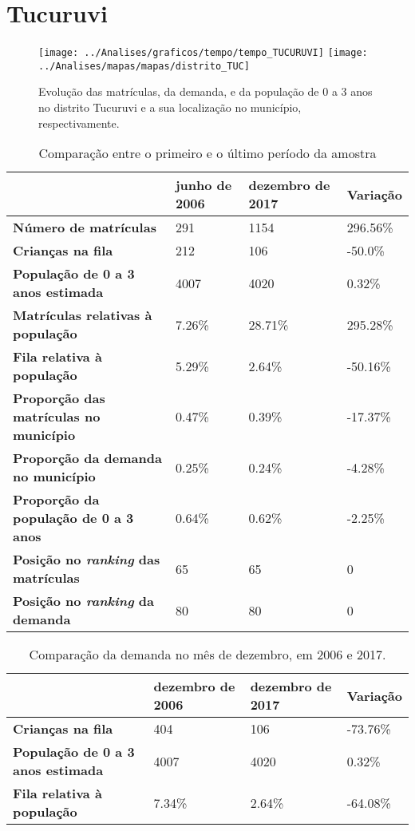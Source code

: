 \section{Tucuruvi}
\begin{figure}[H]
\centering
\texttt{[image: ../Analises/graficos/tempo/tempo\_TUCURUVI]}
\texttt{[image: ../Analises/mapas/mapas/distrito\_TUC]}
\caption{Evolução das matrículas, da demanda, e da população de 0 a 3 anos no distrito Tucuruvi e a sua localização no município, respectivamente.}
\end{figure}
\begin{table}[H]
\begin{tabular}{l|l|l|l}
\textbf{}                                      & \textbf{junho de 2006}       & \textbf{dezembro de 2017}    & \textbf{Variação} \\ \hline
\textbf{Número de matrículas}                  & 291 & 1154 & 296.56\% \\ \hline
\textbf{Crianças na fila}                      & 212 & 106 & -50.0\% \\ \hline
\textbf{População de 0 a 3 anos estimada}      & 4007 & 4020 & 0.32\% \\ \hline
\textbf{Matrículas relativas à população}      & 7.26\% & 28.71\% & 295.28\% \\ \hline
\textbf{Fila relativa à população}             & 5.29\% & 2.64\% & -50.16\% \\ \hline
\textbf{Proporção das matrículas no município} & 0.47\% & 0.39\% & -17.37\% \\ \hline
\textbf{Proporção da demanda no município}     & 0.25\% & 0.24\% & -4.28\% \\ \hline
\textbf{Proporção da população de 0 a 3 anos}  & 0.64\% & 0.62\% & -2.25\% \\ \hline
\textbf{Posição no \textit{ranking} das matrículas}     & 65 & 65 & 0 \\ \hline
\textbf{Posição no \textit{ranking} da demanda}         & 80 & 80 & 0 \\ 
\end{tabular}
\caption{Comparação entre o primeiro e o último período da amostra}
\end{table}
\begin{table}[H]
\begin{tabular}{l|l|l|l}
\textbf{}                                 & \textbf{dezembro de 2006} & \textbf{dezembro de 2017} & \textbf{Variação} \\ \hline
\textbf{Crianças na fila}                      & 404 & 106 & -73.76\% \\ \hline
\textbf{População de 0 a 3 anos estimada}      & 4007 & 4020 & 0.32\% \\ \hline
\textbf{Fila relativa à população}             & 7.34\% & 2.64\% & -64.08\% \\
\end{tabular}
\caption{Comparação da demanda no mês de dezembro, em 2006 e 2017.}
\end{table}
